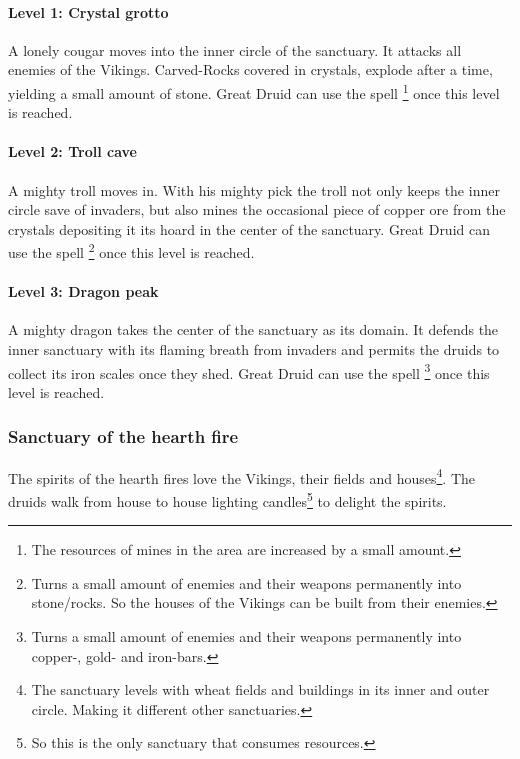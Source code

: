 \paragraph{Level 1: Crystal grotto}
A lonely cougar moves into the inner circle of the sanctuary. It attacks all
enemies of the \gls*{Vikings}. Carved-Rocks covered in crystals, explode after a
time, yielding a small amount of stone. Great Druid can use the spell
\footnote{ The resources of mines in the
	area are increased by a small amount. } once this level is reached.

\paragraph{Level 2: Troll cave}
A mighty troll moves in. With his mighty pick the troll not only keeps the
inner circle save of invaders, but also mines the occasional piece of copper
ore from the crystals depositing it its hoard in the center of the sanctuary.
Great Druid can use the spell \footnote{ Turns a
	small amount of enemies and their weapons permanently into stone/rocks. So the
	houses of the \gls*{Vikings} can be built from their enemies. } once this level
is reached.

\paragraph{Level 3: Dragon peak}
A mighty dragon takes the center of the sanctuary as its domain. It defends the
inner sanctuary with its flaming breath from invaders and permits the druids to
collect its iron scales once they shed. Great Druid can use the spell
\footnote{ Turns a small amount of enemies and their
	weapons permanently into copper-, gold- and iron-bars. } once this level is
reached.

\subsubsection{Sanctuary of the hearth fire}\label{ch:Tribes:Vikings:Religion:City}
The spirits of the hearth fires love the \gls*{Vikings}, their fields and
houses\footnote{ The sanctuary levels with wheat fields and buildings in its
	inner and outer circle. Making it different other sanctuaries. }. The druids
walk from house to house lighting candles\footnote{ So this is the only
	sanctuary that consumes resources. } to delight the spirits.

